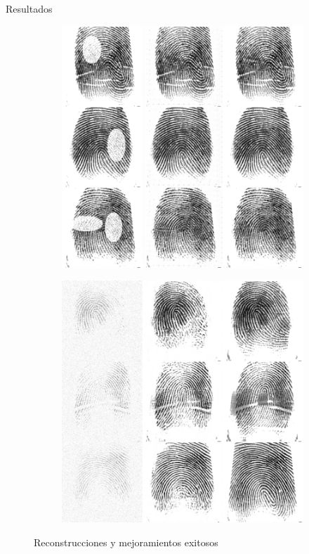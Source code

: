 \documentclass[12pt,aspectratio=169]{beamer}
\begin{document}
\begin{frame}{Resultados}

    \begin{figure}
        \begin{subfigure}{0.45\textwidth}
            \centering
            \includegraphics[scale=0.22]{figs/recons_1.png}
        \end{subfigure}
        \begin{subfigure}{0.45\textwidth}
            \centering
            \includegraphics[scale=0.22]{figs/recons_2.png}
        \end{subfigure}
        \caption{Reconstrucciones y mejoramientos exitosos}
    \end{figure}

\end{frame}
\end{document}
